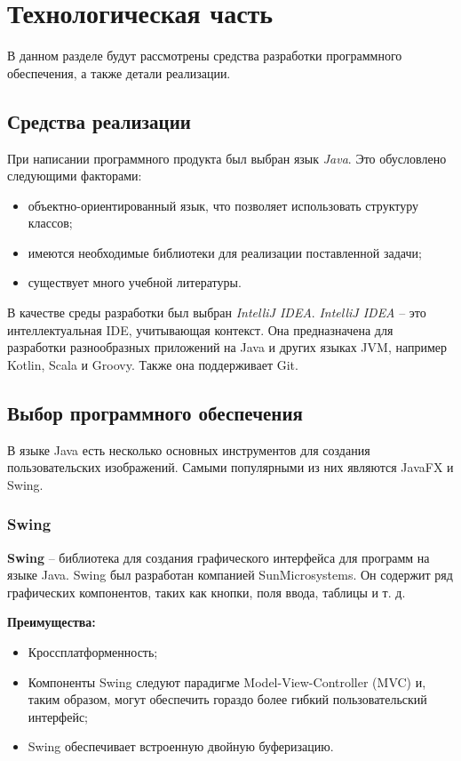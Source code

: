 \chapter{Технологическая часть}

В данном разделе будут рассмотрены средства разработки программного обеспечения, а также детали реализации.


\section{Средства реализации}

При написании программного продукта был выбран язык \textit{Java}. Это обусловлено следующими факторами:

\begin{itemize}
    \item объектно-ориентированный язык, что позволяет использовать структуру классов;
    \item имеются необходимые библиотеки для реализации поставленной задачи;
    \item существует много учебной литературы.
\end{itemize}

В качестве среды разработки был выбран \textit{IntelliJ IDEA}. \textit{IntelliJ IDEA} -- это интеллектуальная IDE, учитывающая контекст. Она предназначена для разработки разнообразных приложений на Java и других языках JVM, например Kotlin, Scala и Groovy. Также она поддерживает Git.

\section{Выбор программного обеспечения}

В языке Java есть несколько основных инструментов для создания пользовательских изображений. Самыми популярными из них являются JavaFX и Swing.

\subsection{Swing}

\textbf{Swing} -- библиотека для создания графического интерфейса для программ на языке Java. Swing был разработан компанией SunMicrosystems. Он содержит ряд графических компонентов, таких как кнопки, поля ввода, таблицы и т. д.

\textbf{Преимущества:} 
\begin{itemize}
	\item Кроссплатформенность;
	\item Компоненты Swing следуют парадигме Model-View-Controller (MVC) и, таким образом, могут обеспечить гораздо более гибкий пользовательский интерфейс;
	\item Swing обеспечивает встроенную двойную буферизацию.
\end{itemize}

